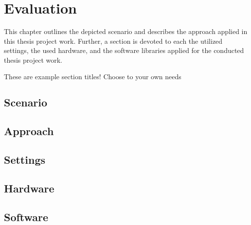 \chapter{Evaluation}
\label{ch:evaluation}
This chapter outlines the depicted scenario and describes the approach applied in this thesis project work. Further, a section is devoted to each the utilized settings, the used hardware, and the software libraries applied for the conducted thesis project work.




These are example section titles! Choose to your own needs


\section{Scenario}


\section{Approach}



\section{Settings}


\section{Hardware}

\section{Software}
